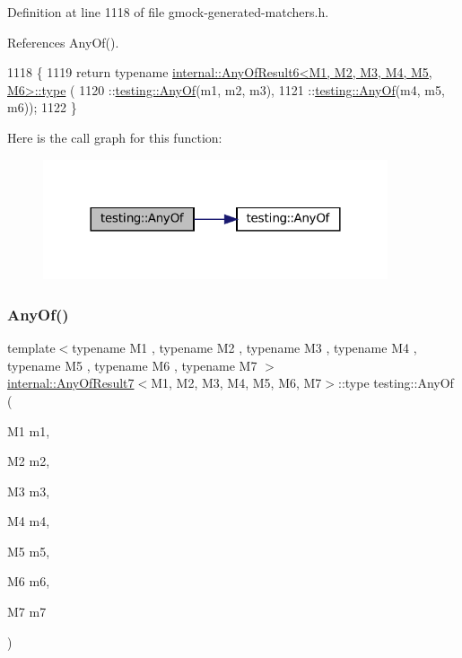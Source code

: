 Definition at line 1118 of file gmock-\/generated-\/matchers.\+h.



References Any\+Of().


\begin{DoxyCode}
1118                                                 \{
1119   \textcolor{keywordflow}{return} \textcolor{keyword}{typename} \hyperlink{namespacegenerate__debs_a50bc9a7ecac9584553e089a448bcde58}{internal::AnyOfResult6<M1, M2, M3, M4, M5, M6>::type}
      (
1120       ::\hyperlink{namespacetesting_a81cfefd9f75cdce827d5bc873cf73aac}{testing::AnyOf}(m1, m2, m3),
1121       ::\hyperlink{namespacetesting_a81cfefd9f75cdce827d5bc873cf73aac}{testing::AnyOf}(m4, m5, m6));
1122 \}
\end{DoxyCode}
Here is the call graph for this function\+:
\nopagebreak
\begin{figure}[H]
\begin{center}
\leavevmode
\includegraphics[width=288pt]{namespacetesting_a747189264a49a426004366371f1a2575_cgraph}
\end{center}
\end{figure}
\mbox{\label{namespacetesting_a754d1bddb237e79613f6834af3329efa}} 
\subsubsection{\texorpdfstring{Any\+Of()}{AnyOf()}\hspace{0.1cm}{\footnotesize\ttfamily [6/9]}}
{\footnotesize\ttfamily template$<$typename M1 , typename M2 , typename M3 , typename M4 , typename M5 , typename M6 , typename M7 $>$ \\
\hyperlink{structtesting_1_1internal_1_1AnyOfResult7}{internal\+::\+Any\+Of\+Result7}$<$M1, M2, M3, M4, M5, M6, M7$>$\+::type testing\+::\+Any\+Of (\begin{DoxyParamCaption}\item[{M1}]{m1,  }\item[{M2}]{m2,  }\item[{M3}]{m3,  }\item[{M4}]{m4,  }\item[{M5}]{m5,  }\item[{M6}]{m6,  }\item[{M7}]{m7 }\end{DoxyParamCaption})\hspace{0.3cm}{\ttfamily [inline]}}



